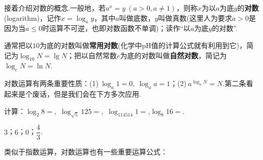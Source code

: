 \documentclass[lang=cn, zihao=5]{elegantbook}
\newcommand{\tk}{\uline{\hspace{4em}}}
\begin{document}
接着介绍对数的概念.一般地，若$a^x=y~(a>0,a \neq 1)$，则称$x$为以$a$为底$y$的\textbf{对数}(logarithm)，记作$x = \log_{a}{y}$，其中$a$叫做底数，$y$叫做真数(这里人为要求$a>0$是因为当$a\leq 0$时运算不可逆，也即对数函数不单调)；读作“以$a$为底$y$的对数”.

通常把以$10$为底的对数叫做\textbf{常用对数}(化学中pH值的计算公式就有利用到它)，简记为$\log_{10}{N}=\lg N$；把以自然常数$e$为底的对数叫做\textbf{自然对数}，简记为$\log_{e}{N}=\ln N$.

对数运算有两条重要性质：(1)$~\log_{a}{1} = 0,~\log_{a}{a}=1$；(2)$~a^{\log_{a}{N}}=N$.第二条看起来是个废话，但是我们会在下方多次应用.

\begin{example}
	计算：$\log_{2}{8}=$\tk ,~$\log_{\sqrt{5}}{125}=$\tk ,~$\log_{114514}{1}=$\tk ,$\log_{8}{16}=$\tk .
\end{example}
\begin{solution}
	$3$；$6$；$0$；$\dfrac{4}{3}$.
\end{solution}

类似于指数运算，对数运算也有一些重要运算公式：
\end{document}
